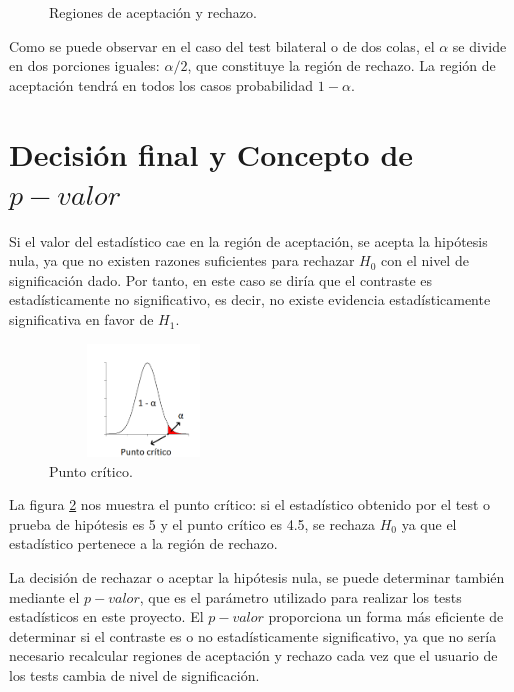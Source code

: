 \begin{figure}[h]
\centering
{}
\caption{Regiones de aceptación y rechazo.}
\label{fig:intervalos_normal}
\end{figure}

Como se puede observar en el caso del test bilateral o de dos colas, el $\alpha$ se divide en dos porciones iguales:
$\alpha / 2$, que constituye la región de rechazo. La región de aceptación tendrá en todos los casos probabilidad
$1 - \alpha$.


\section{Decisión final y Concepto de $p-valor$}
Si el valor del estadístico cae en la región de aceptación, se acepta la hipótesis nula, ya que no existen
razones suficientes para rechazar $H_0$ con el nivel de significación dado. Por tanto, en este caso se diría
que el contraste es estadísticamente no significativo, es decir, no existe evidencia estadísticamente significativa
en favor de $H_1$.
\begin{figure}[h]
\centering
\includegraphics[width=5cm,height=3cm]{figuras/critico.png}
\caption{Punto crítico.}
\label{fig:punto_critico}
\end{figure}
La figura \ref{fig:punto_critico} nos muestra el punto crítico: si el estadístico obtenido por el test o
prueba de hipótesis es 5 y el punto crítico es 4.5, se rechaza $H_0$ ya que el estadístico pertenece a la
región de rechazo.

La decisión de rechazar o aceptar la hipótesis nula, se puede determinar también mediante el $p-valor$,
que es el parámetro utilizado para realizar los tests estadísticos en este proyecto. El $p-valor$ proporciona
un forma más eficiente de determinar si el contraste es o no estadísticamente significativo, ya que no sería
necesario recalcular regiones de aceptación y rechazo cada vez que el usuario de los tests cambia de nivel de
significación.

